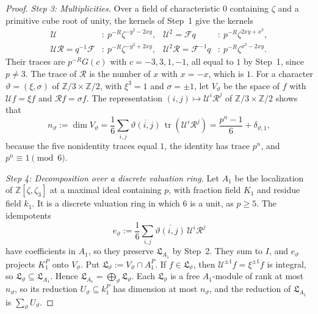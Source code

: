 \documentclass[11pt]{amsart}
\numberwithin{equation}{section}
\theoremstyle{plain}
\theoremstyle{definition}
\theoremstyle{remark}
\newcommand{\tr}{\operatorname{tr}}
\begin{document}
\begin{proof}
\emph{Step 3: Multiplicities.} Over a field of characteristic \(0\) containing \(\zeta\) and a primitive cube root of unity, the kernels of Step~1 give the kernels
\begin{align*}
\mathcal U&:\ p^{-R}\zeta^{-y^2-2xy},&\mathcal U^2=\mathcal Fq&:\ p^{-R}\zeta^{2xy+x^2},\\
\mathcal U\mathcal R=q^{-1}\mathcal F&:\ p^{-R}\zeta^{-y^2+2xy},&\mathcal U^2\mathcal R=\mathcal F^{-1}q&:\ p^{-R}\zeta^{x^2-2xy}.
\end{align*}
Their traces are \(p^{-R}G(c)\) with \(c=-3,3,1,-1\), all equal to \(1\) by Step~1, since \(p\ne3\). The trace of \(\mathcal R\) is the number of \(x\) with \(x=-x\), which is \(1\). For a character \(\vartheta=(\xi,\sigma)\) of \(\mathbb Z/3\times\mathbb Z/2\), with \(\xi^3=1\) and \(\sigma=\pm1\), let \(V_\vartheta\) be the space of \(f\) with \(\mathcal Uf=\xi f\) and \(\mathcal Rf=\sigma f\). The representation \((i,j)\mapsto\mathcal U^i\mathcal R^j\) of \(\mathbb Z/3\times\mathbb Z/2\) shows that
\[n_\vartheta:=\dim V_\vartheta=\frac16\sum_{i,j}\overline{\vartheta(i,j)}\,\tr(\mathcal U^i\mathcal R^j)=\frac{p^n-1}6+\delta_{\vartheta,1},\]
because the five nonidentity traces equal \(1\), the identity has trace \(p^n\), and \(p^n\equiv1\pmod6\).

\emph{Step 4: Decomposition over a discrete valuation ring.} Let \(A_1\) be the localization of \(\mathbb Z[\zeta,\zeta_3]\) at a maximal ideal containing \(p\), with fraction field \(K_1\) and residue field \(k_1\). It is a discrete valuation ring in which \(6\) is a unit, as \(p\ge5\). The idempotents
\[e_\vartheta:=\frac16\sum_{i,j}\overline{\vartheta(i,j)}\,\mathcal U^i\mathcal R^j\]
have coefficients in \(A_1\), so they preserve \(\mathfrak L_{A_1}\) by Step~2. They sum to \(I\), and \(e_\vartheta\) projects \(K_1^P\) onto \(V_\vartheta\). Put \(\mathfrak L_\vartheta:=V_\vartheta\cap A_1^P\). If \(f\in\mathfrak L_\vartheta\), then \(\mathcal U^{\pm1}f=\xi^{\pm1}f\) is integral, so \(\mathfrak L_\vartheta\subseteq\mathfrak L_{A_1}\). Hence \(\mathfrak L_{A_1}=\bigoplus_\vartheta\mathfrak L_\vartheta\). Each \(\mathfrak L_\vartheta\) is a free \(A_1\)-module of rank at most \(n_\vartheta\), so its reduction \(U_\vartheta\subseteq k_1^P\) has dimension at most \(n_\vartheta\), and the reduction of \(\mathfrak L_{A_1}\) is \(\sum_\vartheta U_\vartheta\).


\end{proof}
\end{document}
